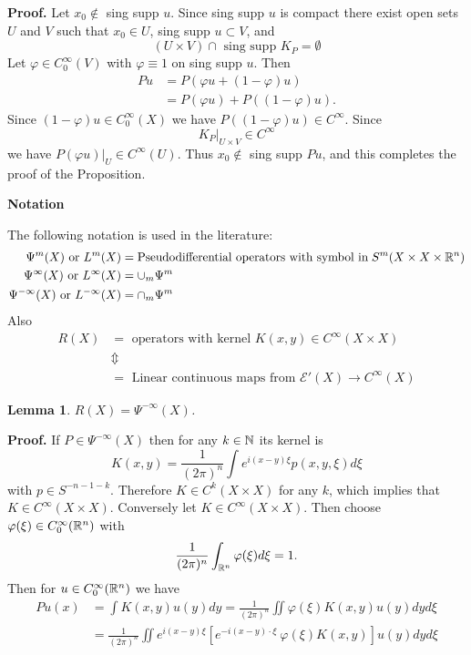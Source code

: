 \documentclass[12pt,reqno]{amsart}
\theoremstyle{plain}  %
\newtheorem{lemma}{Lemma}
\theoremstyle{definition}
\newcommand{\nin}{\noindent}
\begin{document}
\nin
{\bf Proof.}
Let $x_0 \notin $ sing supp $ u.$
Since sing supp $ u $ is compact there exist open sets $U$ and $V$ such that 
$x_0 \in U$, sing supp $u \subset V$, and
$$(U \times V) \cap \text{ sing supp } K_P = \emptyset$$
Let $\varphi \in C_0^\infty (V)$ with $\varphi \equiv 1$ on sing supp $ u$.
Then
\begin{align*}
Pu &=P(\varphi u + (1 - \varphi)u) \\
&=P(\varphi u) + P ((1- \varphi)u).
\end{align*}
Since $(1 - \varphi) u \in C_0^\infty (X)$ we have $P((1 - \varphi)u) \in C^\infty$.
Since
$$K_P|_{U\times V} \in C^\infty$$
we have $P(\varphi u)|_U \in C^\infty (U)$.
Thus $x_0 \notin $ sing supp $Pu$, and this completes the proof of the
Proposition.
\vskip0.1in
\centerline{\bf Notation}
\vskip0.1in
\nin
The following notation is used in the literature:
\begin{align*}
\Psi^m(X) \text{ or }L^m(X) &= \text{Pseudodifferential operators with 
symbol in}\; S^m (X
\times X \times \Bbb R^n) \\ 
\Psi^\infty(X) \text{ or }L^\infty(X) &= \cup_m \Psi^m \\
\Psi^{-\infty}(X) \text{ or }L^{-\infty}(X) &= \cap_m \Psi^m
\end{align*} 
Also 
\begin{align*}
R(X) &= \text{ operators with
kernel } K(x,y) \in C^\infty (X\times X)\\ &\Updownarrow \\
&=\text{ Linear continuous maps from }  \mathcal E'(X) \longrightarrow C^\infty (X)
\end{align*} 
\begin{lemma}  $ R(X) = \Psi^{- \infty} (X)$.
\end{lemma}
\nin
{\bf Proof.}  If $P\in \Psi^{-\infty} (X)$ then for any $k \in \Bbb N$ its
kernel is
$$K(x,y) = \frac{1}{(2 \pi)^n} \int e^{i(x-y)\xi} p(x,y, \xi)d\xi$$
with $p \in S^{-n-1-k}$. Therefore $K \in C^k (X \times X)$ for any $k$, which
implies that $K \in C^\infty (X \times X)$. Conversely let
 $K \in C^\infty (X \times X)$. Then choose
$\varphi(\xi)\in C_0^\infty (\Bbb R^n)$ with
$$\frac{1}{(2\pi)^n} \int_{\Bbb R^n}  \varphi(\xi)d\xi=1.$$
Then for $u \in C_0^\infty (\Bbb R^n)$ we
have 
\begin{align*}
Pu(x) &=\int K(x,y)u(y)dy = \frac{1}{(2\pi)^n} \iint \varphi(\xi) K (x,y)u(y)dy d\xi
\\ 
&=\frac{1}{(2\pi)^n} \iint e^{i(x-y)\xi} [e^{-i(x-y) \cdot \xi}\  \varphi(\xi)
K(x,y)] u(y) dy d\xi
\end{align*}
\end{document}
